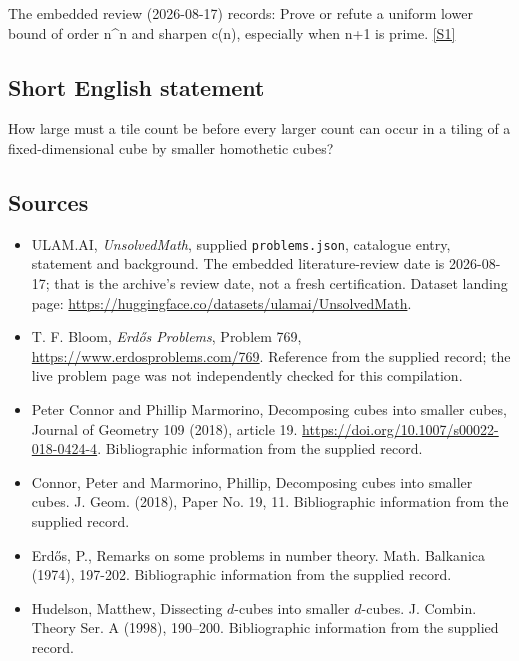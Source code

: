 \documentclass[11pt,a4paper]{article}
\newcommand{\sref}[2]{\hyperlink{source:#1:#2}{[S#2]}}
\begin{document}
The embedded review (2026-08-17) records: Prove or refute a uniform lower bound of order n\textasciicircum{}n and sharpen c(n), especially when n+1 is prime. \sref{statement}{1}

\subsection{Short English statement}

How large must a tile count be before every larger count can occur in a tiling of a fixed-dimensional cube by smaller homothetic cubes?

\subsection{Sources}

{\small

\begin{itemize}

\item[\hypertarget{source:statement:1}{S1}] ULAM.AI, \emph{UnsolvedMath}, supplied \texttt{problems.json}, catalogue entry, statement and background. The embedded literature-review date is 2026-08-17; that is the archive’s review date, not a fresh certification. Dataset landing page: \url{https://huggingface.co/datasets/ulamai/UnsolvedMath}.

\item[\hypertarget{source:statement:2}{S2}] T. F. Bloom, \emph{Erdős Problems}, Problem 769, \url{https://www.erdosproblems.com/769}. Reference from the supplied record; the live problem page was not independently checked for this compilation.

\item[\hypertarget{source:statement:3}{S3}] Peter Connor and Phillip Marmorino, Decomposing cubes into smaller cubes, Journal of Geometry 109 (2018), article 19. \url{https://doi.org/10.1007/s00022-018-0424-4}. Bibliographic information from the supplied record.

\item[\hypertarget{source:statement:4}{S4}] Connor, Peter and Marmorino, Phillip, Decomposing cubes into smaller cubes. J. Geom. (2018), Paper No. 19, 11. Bibliographic information from the supplied record.

\item[\hypertarget{source:statement:5}{S5}] Erd\H{o}s, P., Remarks on some problems in number theory. Math. Balkanica (1974), 197-202. Bibliographic information from the supplied record.

\item[\hypertarget{source:statement:6}{S6}] Hudelson, Matthew, Dissecting {$d$}-cubes into smaller {$d$}-cubes. J. Combin. Theory Ser. A (1998), 190--200. Bibliographic information from the supplied record.

\end{itemize}

}

\label{end:statement}
\end{document}
